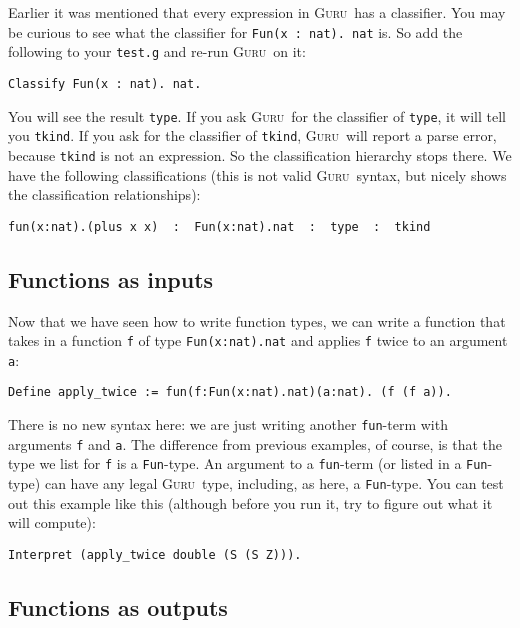 \documentclass{book}[12pt]
\newcommand{\guru}[0]{\textsc{Guru}}
\begin{document}
Earlier it was mentioned that every expression in \guru\ has a
classifier.  You may be curious to see what the classifier for
\texttt{Fun(x : nat). nat} is.  So add the following to your
\texttt{test.g} and re-run \guru\ on it:

\begin{verbatim}
Classify Fun(x : nat). nat.
\end{verbatim}

\noindent You will see the result \texttt{type}.  If you ask \guru\
for the classifier of \texttt{type}, it will tell you \texttt{tkind}.
If you ask for the classifier of \texttt{tkind}, \guru\ will report a
parse error, because \texttt{tkind} is not an expression.  So the
classification hierarchy stops there.  We have the following
classifications (this is not valid \guru\ syntax, but nicely shows the
classification relationships):

\begin{verbatim}
fun(x:nat).(plus x x)  :  Fun(x:nat).nat  :  type  :  tkind
\end{verbatim} 

\subsection{Functions as inputs}

Now that we have seen how to write function types, we can write a
function that takes in a function \texttt{f} of type
\texttt{Fun(x:nat).nat} and applies \texttt{f} twice to an argument
\texttt{a}:

\begin{verbatim}
Define apply_twice := fun(f:Fun(x:nat).nat)(a:nat). (f (f a)).
\end{verbatim}

\noindent There is no new syntax here: we are just writing another
\texttt{fun}-term with arguments \texttt{f} and \texttt{a}.  The
difference from previous examples, of course, is that the type we list
for \texttt{f} is a \texttt{Fun}-type.  An argument to a
\texttt{fun}-term (or listed in a \texttt{Fun}-type) can have any
legal \guru\ type, including, as here, a \texttt{Fun}-type. You can
test out this example like this (although before you run it, try to
figure out what it will compute):

\begin{verbatim}
Interpret (apply_twice double (S (S Z))).
\end{verbatim}

\subsection{Functions as outputs}
\end{document}
